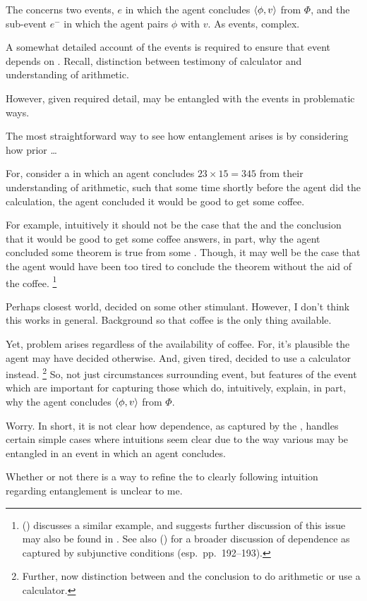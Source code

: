 \begin{note}
  The \qWVitc{} concerns two events, \(e\) in which the agent concludes \(\langle \phi, v \rangle\) from \(\Phi\), and the sub-event \(e^{-}\) in which the agent pairs \(\phi\) with \(v\).
  As events, complex.

  A somewhat detailed account of the events is required to ensure that event depends on \ros{}.
  Recall, distinction between testimony of calculator and understanding of arithmetic.

  However, given required detail,  may be entangled with the events in problematic ways.

  The most straightforward way to see how entanglement arises is by considering how prior  \dots

  For, consider a  in which an agent concludes \(23 \times 15 = 345\) from their understanding of arithmetic, such that some time shortly before the agent did the calculation, the agent concluded it would be good to get some coffee.

  For example, intuitively it should not be the case that the \ros{} and the conclusion that it would be good to get some coffee answers, in part, why the agent concluded some theorem is true from some \poP{}.
  Though, it may well be the case that the agent would have been too tired to conclude the theorem without the aid of the coffee.%
  \footnote{
    \citeauthor{Armstrong:1968vh} (\citeyear[195--196]{Armstrong:1968vh}) discusses a similar example, and suggests further discussion of this issue may also be found in \textcite{Moore:1962up}.
    See also \citeauthor{Sanford:1989aa} (\citeyear{Sanford:1989aa}) for a broader discussion of dependence as captured by subjunctive conditions (esp.\ pp.\ 192--193).
  }

  Perhaps closest world, decided on some other stimulant.
  However, I don't think this works in general.
  Background so that coffee is the only thing available.

  Yet, problem arises regardless of the availability of coffee.
  For, it's plausible the agent may have decided otherwise.
  And, given tired, decided to use a calculator instead.%
  \footnote{
    Further, now distinction  between  and the conclusion to do arithmetic or use a calculator.
  }
  So, not just circumstances surrounding event, but features of the event which are important for capturing those  which do, intuitively, explain, in part, why the agent concludes \(\langle \phi, v \rangle\) from \(\Phi\).

  Worry.
  In short, it is not clear how dependence, as captured by the \qWVitc{}, handles certain simple cases where intuitions seem clear due to the way various  may be entangled in an event in which an agent concludes.

  Whether or not there is a way to refine the \qWVitc{} to clearly following intuition regarding entanglement is unclear to me.
\end{note}

